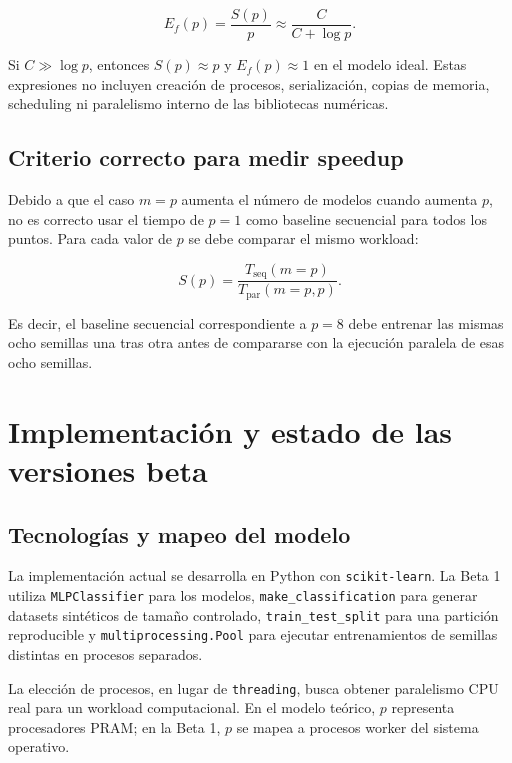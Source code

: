 \documentclass[11pt,a4paper]{article}
\newcommand{\Speedup}{S}
\newcommand{\Efficiency}{E_f}
\newcommand{\Cost}{C}
\begin{document}
\begin{equation}
    \Efficiency(p)=\frac{\Speedup(p)}{p}
    \approx\frac{\Cost}{\Cost+\log p}.
    \label{eq:eficiencia}
\end{equation}

Si $\Cost\gg\log p$, entonces $\Speedup(p)\approx p$ y $\Efficiency(p)\approx1$ en el
modelo ideal. Estas expresiones no incluyen creación de procesos, serialización, copias
de memoria, scheduling ni paralelismo interno de las bibliotecas numéricas.

\subsection{Criterio correcto para medir speedup}

Debido a que el caso $m=p$ aumenta el número de modelos cuando aumenta $p$, no es
correcto usar el tiempo de $p=1$ como baseline secuencial para todos los puntos. Para
cada valor de $p$ se debe comparar el mismo workload:

\begin{equation}
    \Speedup(p)=
    \frac{T_{\mathrm{seq}}(m=p)}{T_{\mathrm{par}}(m=p,p)}.
    \label{eq:speedup-experimental}
\end{equation}

Es decir, el baseline secuencial correspondiente a $p=8$ debe entrenar las mismas ocho
semillas una tras otra antes de compararse con la ejecución paralela de esas ocho
semillas.

\section{Implementación y estado de las versiones beta}

\subsection{Tecnologías y mapeo del modelo}

La implementación actual se desarrolla en Python con \texttt{scikit-learn}. La Beta 1
utiliza \texttt{MLPClassifier} para los modelos, \texttt{make\_classification} para
generar datasets sintéticos de tamaño controlado, \texttt{train\_test\_split} para una
partición reproducible y \texttt{multiprocessing.Pool} para ejecutar entrenamientos de
semillas distintas en procesos separados.

La elección de procesos, en lugar de \texttt{threading}, busca obtener paralelismo CPU
real para un workload computacional. En el modelo teórico, $p$ representa procesadores
PRAM; en la Beta 1, $p$ se mapea a procesos worker del sistema operativo.
\end{document}
